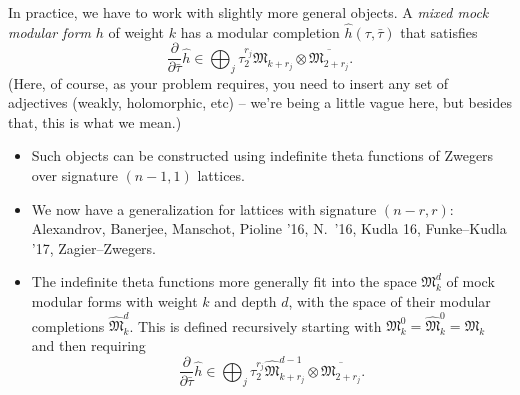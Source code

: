 \documentclass[reqno]{amsart} 
\numberwithin{theorem}{section}
\numberwithin{equation}{section}
\begin{document}
In practice, we have to work with slightly more general objects.  A \emph{mixed mock modular form} $h$ of weight $k$ has a modular completion $\hat{h}(\tau, \bar{\tau})$ that satisfies
\begin{equation*}
  \frac{\partial}{ \partial \bar{\tau}} \hat{h} \in \bigoplus_j \tau_2^{r_j} \mathfrak{M}_{k + r_j} \otimes \overline{\mathfrak{M}_{2 + r_j}}.
\end{equation*}
(Here, of course, as your problem requires, you need to insert any set of adjectives (weakly, holomorphic, etc) -- we're being a little vague here, but besides that, this is what we mean.)
\begin{itemize}
\item Such objects can be constructed using indefinite theta functions of Zwegers over signature $(n - 1, 1)$ lattices.
\item We now have a generalization for lattices with signature $(n - r, r)$: Alexandrov, Banerjee, Manschot, Pioline '16, N.\ '16, Kudla 16, Funke--Kudla '17, Zagier--Zwegers.
\item The indefinite theta functions more generally fit into the space $\mathfrak{M}_k^d$ of mock modular forms with weight $k$ and depth $d$, with the space of their modular completions $\hat{\mathfrak{M}}_k^d$.  This is defined recursively starting with $\mathfrak{M}_k^0  = \hat{\mathfrak{M} }_k^0 = \mathfrak{M}_k$ and  then requiring
  \begin{equation*}
    \frac{\partial}{\partial \bar{\tau}} \hat{h} \in \bigoplus_j \tau_2^{r_j} \hat{\mathfrak{M}}_{k + r_j}^{d - 1}
    \otimes \overline{\mathfrak{M}_{2 + r_j}}.
  \end{equation*}
\end{itemize}
\end{document}
